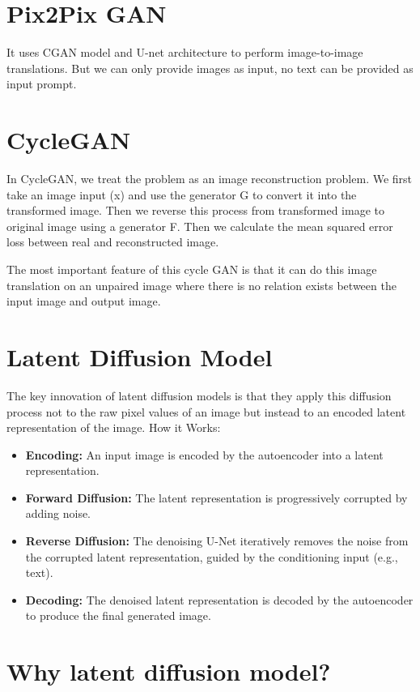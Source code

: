 \section*{Pix2Pix GAN}
It uses CGAN model and U-net architecture to perform image-to-image translations. But we can only provide images as input, no text can be provided as input prompt.

\section*{CycleGAN}
In CycleGAN, we treat the problem as an image reconstruction problem. We first take an image input (x) and use the generator G to convert it into the transformed image. Then we reverse this process from transformed image to original image using a generator F. Then we calculate the mean squared error loss between real and reconstructed image.\par
The most important feature of this cycle GAN is that it can do this image translation on an unpaired image where there is no relation exists between the input image and output image.

\section*{Latent Diffusion Model}
The key innovation of latent diffusion models is that they apply this diffusion process not to the raw pixel values of an image but instead to an encoded latent representation of the image.
How it Works:
\begin{itemize}
    \item \textbf{Encoding:} An input image is encoded by the autoencoder into a latent representation. 
    \item \textbf{Forward Diffusion:} The latent representation is progressively corrupted by adding noise. 
    \item \textbf{Reverse Diffusion:} The denoising U-Net iteratively removes the noise from the corrupted latent representation, guided by the conditioning input (e.g., text). 
    \item \textbf{Decoding:} The denoised latent representation is decoded by the autoencoder to produce the final generated image.
\end{itemize}

\section{Why latent diffusion model?} \label{sec:WhyLDM}

